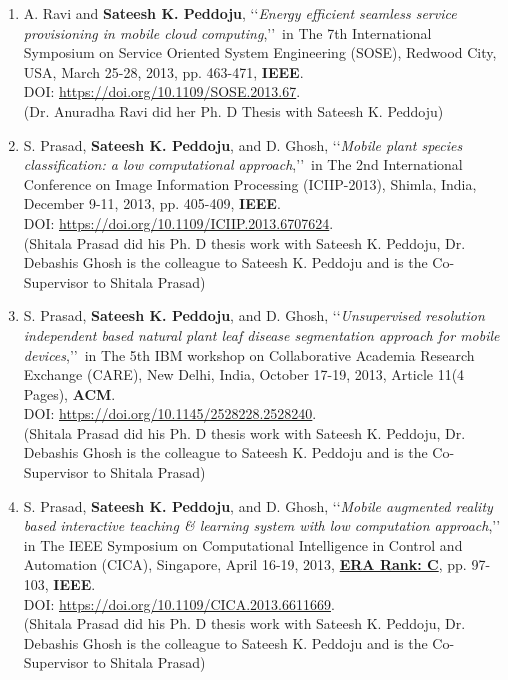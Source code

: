 \begin{enumerate}
	
	\item
	A. Ravi and \textbf{Sateesh K. Peddoju}, \lq\lq \textit{Energy efficient seamless service provisioning in mobile cloud computing},\rq\rq\, in The 7th International Symposium on Service Oriented System Engineering (SOSE), Redwood City, USA, March 25-28, 2013, pp. 463-471, \textbf{IEEE}. \\DOI: \url{https://doi.org/10.1109/SOSE.2013.67}. \\(Dr. Anuradha Ravi did her Ph. D Thesis with Sateesh K. Peddoju)
	
	\item
	S. Prasad, \textbf{Sateesh K. Peddoju}, and D. Ghosh, \lq\lq \textit{Mobile plant species classification: a low computational approach},\rq\rq\, in The 2nd International Conference on Image Information Processing (ICIIP-2013), Shimla, India, December 9-11, 2013, pp. 405-409, \textbf{IEEE}. \\DOI: \url{https://doi.org/10.1109/ICIIP.2013.6707624}. \\(Shitala Prasad did his Ph. D thesis work with Sateesh K. Peddoju, Dr. Debashis Ghosh is the colleague to Sateesh K. Peddoju and is the Co-Supervisor to Shitala Prasad)

	
	\item
	S. Prasad, \textbf{Sateesh K. Peddoju}, and D. Ghosh, \lq\lq \textit{Unsupervised resolution independent based natural plant leaf disease segmentation approach for mobile devices},\rq\rq\, in The 5th IBM workshop on Collaborative Academia Research Exchange (CARE), New Delhi, India,  October 17-19, 2013, Article 11(4 Pages), \textbf{ACM}. \\DOI: \url{https://doi.org/10.1145/2528228.2528240}. \\(Shitala Prasad did his Ph. D thesis work with Sateesh K. Peddoju, Dr. Debashis Ghosh is the colleague to Sateesh K. Peddoju and is the Co-Supervisor to Shitala Prasad)

	
	\item
	S. Prasad, \textbf{Sateesh K. Peddoju}, and D. Ghosh, \lq\lq \textit{Mobile augmented reality based interactive teaching \& learning system with low computation approach},\rq\rq\, in The IEEE Symposium on Computational Intelligence in Control and Automation (CICA), Singapore, April 16-19, 2013, \underline{\textbf{ERA Rank: C}}, pp. 97-103, \textbf{IEEE}. \\DOI: \url{https://doi.org/10.1109/CICA.2013.6611669}.\\(Shitala Prasad did his Ph. D thesis work with Sateesh K. Peddoju, Dr. Debashis Ghosh is the colleague to Sateesh K. Peddoju and is the Co-Supervisor to Shitala Prasad)


\end{enumerate}
